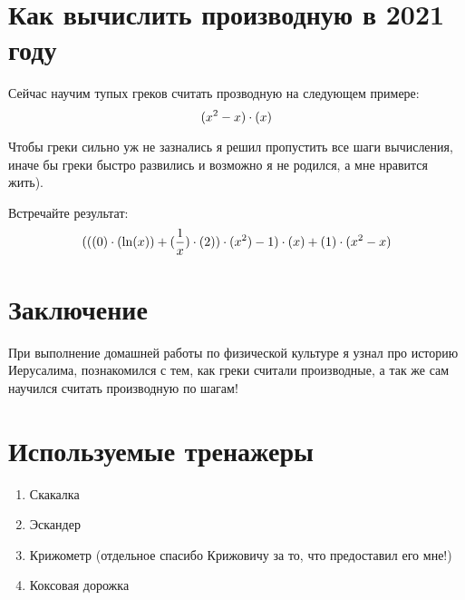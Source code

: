 \documentclass[a4paper,12pt]{article}
\begin{document}
\section{Как вычислить производную в 2021 году}

Сейчас научим тупых греков считать прозводную на следующем примере:
\begin{equation}
\large(x^{2} -x\large) \cdot \large(x\large)
\end{equation} 

Чтобы греки сильно уж не зазнались я решил пропустить все шаги вычисления, иначе бы греки быстро развились и возможно я не родился, а мне нравится жить).

 Встречайте результат:
\begin{equation}
\large(\large(\large(0\large) \cdot \large(\ln(x) \large)+\large(\frac{1}{x} \large) \cdot \large(2\large)\large) \cdot \large(x^{2} \large)-1\large) \cdot \large(x\large)+\large(1\large) \cdot \large(x^{2} -x\large)
\end{equation} 
\section{Заключение}
 При выполнение домашней работы по физической культуре я узнал про историю Иерусалима, познакомился с тем, как греки считали производные, а так же сам научился считать производную по шагам!
\section{Используемые тренажеры}
 \begin{enumerate}
 \item Скакалка
 \item Эскандер
 \item Крижометр (отдельное спасибо Крижовичу за то, что предоставил его мне!)
 \item Коксовая дорожка
 \end{enumerate}
\end{document}
